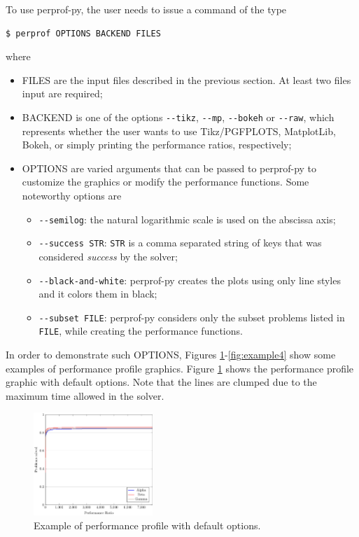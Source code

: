     To use perprof-py, the user needs to issue a command of the type
\begin{verbatim}
$ perprof OPTIONS BACKEND FILES
\end{verbatim}
    where
    \begin{itemize}
      \item FILES are the input files described in the previous section. At
        least two files input are required;
      \item BACKEND is one of the options \verb+--tikz+, \verb+--mp+,
        \verb+--bokeh+ or
        \verb+--raw+, which represents whether the user wants to use
        Tikz/PGFPLOTS, MatplotLib, Bokeh, or simply printing the performance
        ratios, respectively;
      \item OPTIONS are varied arguments that can be passed to perprof-py to
        customize the graphics or modify the performance functions. Some
        noteworthy options are
        \begin{itemize}
          \item \verb+--semilog+: the natural logarithmic scale is used on the
          abscissa axis;
          \item \verb+--success STR+: \verb+STR+ is a comma separated string
            of keys that was considered  \emph{success} by the solver;
          \item \verb+--black-and-white+: perprof-py creates the plots using
            only line styles and it colors them in black;
          \item \verb+--subset FILE+: perprof-py considers only the subset problems listed in \verb+FILE+, while creating the performance functions.
        \end{itemize}
    \end{itemize}
    In order to demonstrate such OPTIONS, Figures
    \ref{fig:example1}-\ref{fig:example4} show some examples of  performance
    profile graphics.
    Figure \ref{fig:example1} shows the performance profile graphic with default
    options. Note that the lines are clumped due to the maximum time allowed
    in the solver.
    \begin{figure}[!ht]
      \centering
      \includegraphics[width=0.4\textwidth]{plots/abc.pdf}
      \caption{Example of performance profile with default options.}
      \label{fig:example1}
    \end{figure}
